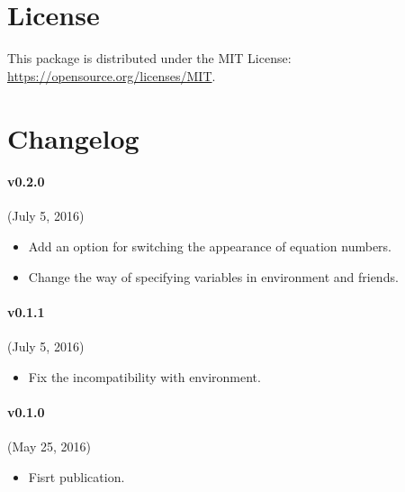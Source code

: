 \documentclass[a4paper,10pt]{article}
\begin{document}
\section{License}
This package is distributed under the MIT License: \url{https://opensource.org/licenses/MIT}.

\section{Changelog}
\paragraph{v0.2.0} (July 5, 2016)
\begin{itemize}
    \item Add an option for switching the appearance of equation numbers.
    \item Change the way of specifying variables in  environment and friends.
\end{itemize}
\paragraph{v0.1.1} (July 5, 2016)
\begin{itemize}
    \item Fix the incompatibility with  environment.
\end{itemize}
\paragraph{v0.1.0} (May 25, 2016)
\begin{itemize}
    \item Fisrt publication.
\end{itemize}
\end{document}

